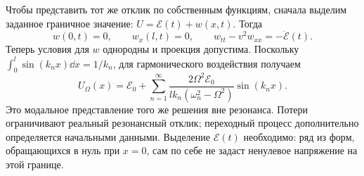 Чтобы представить тот же отклик по собственным функциям, сначала выделим заданное граничное значение: $U=\mathcal E(t)+w(x,t)$. Тогда
\[
 w(0,t)=0,\qquad w_x(l,t)=0,\qquad
 w_{tt}-v^2w_{xx}=-\ddot{\mathcal E}(t).
\]
Теперь условия для $w$ однородны и проекция допустима. Поскольку $\int_0^l\sin(k_nx)\dd x=1/k_n$, для гармонического воздействия получаем
\begin{equation}
 U_\Omega(x)=\mathcal E_0+
 \sum_{n=1}^{\infty}
 \frac{2\Omega^2\mathcal E_0}
 {lk_n(\omega_n^2-\Omega^2)}\sin(k_nx).
\end{equation}
Это модальное представление того же решения вне резонанса. Потери ограничивают реальный резонансный отклик; переходный процесс дополнительно определяется начальными данными. Выделение $\mathcal E(t)$ необходимо: ряд из форм, обращающихся в нуль при $x=0$, сам по себе не задаст ненулевое напряжение на этой границе.
